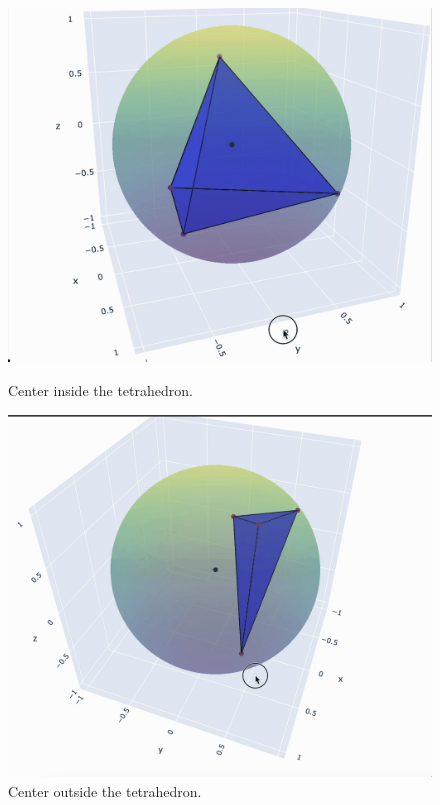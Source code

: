 \documentclass{article}
\begin{document}
\begin{figure}[H]
    \centering
    \begin{minipage}[b]{0.45\textwidth}
        \centering
        \includegraphics[width=\textwidth]{inside.png} 
        \caption{Center inside the tetrahedron.}
        \label{fig:center_inside}
    \end{minipage}
    \hfill
    \begin{minipage}[b]{0.45\textwidth}
        \centering
        \includegraphics[width=\textwidth]{outside.png} 
        \caption{Center outside the tetrahedron.}
        \label{fig:center_outside}
    \end{minipage}
\end{figure}
\end{document}
